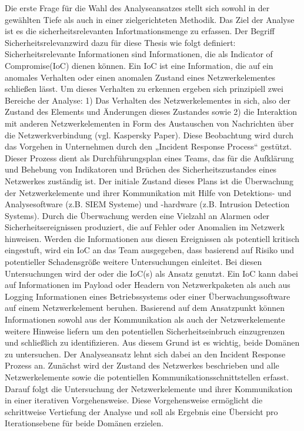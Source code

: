 Die erste Frage für die Wahl des Analyseansatzes stellt sich sowohl in der gewählten Tiefe als auch in einer zielgerichteten Methodik. Das Ziel der Analyse ist es die sicherheitsrelevanten Infortmationsmenge zu erfassen. Der Begriff \glqq Sicherheitsrelevanz\grqq wird dazu für diese Thesis wie folgt definiert: Sicherheitsrelevante Informationen sind Informationen, die als \glqq Indicator of Compromise\grqq (IoC) dienen können. 
Ein IoC ist eine Information, die auf ein anomales Verhalten oder einen anomalen Zustand eines Netzwerkelementes schließen lässt. Um dieses Verhalten zu erkennen ergeben sich prinzipiell zwei Bereiche der Analyse: 1) Das Verhalten des Netzwerkelementes in sich, also der Zustand des Elements und Änderungen dieses Zustandes sowie 2) die Interaktion mit anderen Netzwerkelementen in Form des Austauschen von Nachrichten über die Netzwerkverbindung (vgl. Kaspersky Paper).
Diese Beobachtung wird durch das Vorgehen in Unternehmen durch den „Incident Response Process“ gestützt. Dieser Prozess dient als Durchführungsplan eines Teams, das für die Aufklärung und Behebung von Indikatoren und Brüchen des Sicherheitszustandes eines Netzwerkes  
zuständig ist. Der initiale Zustand dieses Plans ist die Überwachung der Netzwerkelemente und ihrer Kommunikation mit Hilfe von Detektions- und Analysesoftware (z.B. SIEM Systeme) und -hardware (z.B. \glqq Intrusion Detection Systems\grqq). Durch die Überwachung werden eine Vielzahl an Alarmen oder Sicherheitsereignissen produziert, die auf Fehler oder Anomalien im Netzwerk hinweisen. Werden die Informationen aus diesen Ereignissen als potentiell kritisch eingestuft, wird ein IoC an das Team ausgegeben, dass basierend auf Risiko und potentieller Schadensgröße weitere Untersuchungen einleitet. Bei diesen Untersuchungen wird der oder die IoC(s) als Ansatz genutzt. Ein IoC kann dabei auf Informationen im Payload oder Headern von Netzwerkpaketen als auch aus Logging Informationen eines Betriebssystems oder einer Überwachungssoftware auf einem Netzwerkelement beruhen. Basierend auf dem Ansatzpunkt können Informationen sowohl aus der Kommunikation als auch der Netzwerkelemente weitere Hinweise liefern um den potentiellen Sicherheitseinbruch einzugrenzen und schließlich zu identifizieren.
Aus diesem Grund ist es wichtig, beide Domänen zu untersuchen. Der Analyseansatz lehnt sich dabei an den Incident Response Prozess an. Zunächst wird der Zustand des Netzwerkes beschrieben und alle Netzwerkelemente sowie die potentiellen Kommunikationsschnittstellen erfasst. Darauf folgt die Untersuchung der Netzwerkelemente und ihrer Kommunikation in einer iterativen Vorgehensweise. Diese Vorgehensweise ermöglicht die schrittweise Vertiefung der Analyse  und soll als Ergebnis eine Übersicht pro Iterationsebene für beide Domänen erzielen. 
